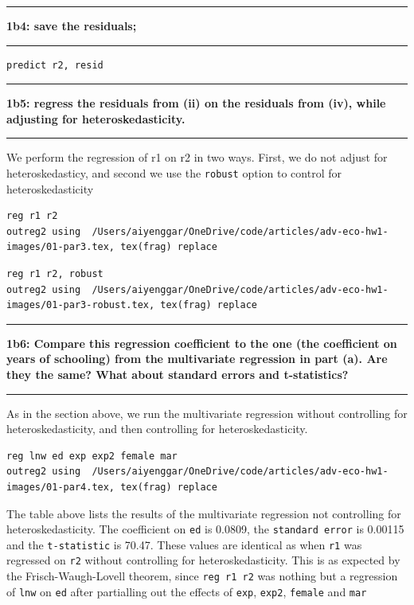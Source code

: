 \documentclass[12pt]{article}
\newcommand\question[2]{\vspace{1em}\hrule\vspace{1em}\textbf{#1: #2}\vspace{1em}\hrule\vspace{1em}}
\begin{document}
\question{1b4}{save the residuals; }
\begin{verbatim}predict r2, resid\end{verbatim}


\question{1b5}{regress the residuals from (ii) on the residuals from (iv), while adjusting for heteroskedasticity.}
We perform the regression of r1 on r2 in two ways. First, we do not adjust for heteroskedasticy, and second we use the \verb|robust| option to  control for heteroskedasticity
\begin{lstlisting}
reg r1 r2
outreg2 using  /Users/aiyenggar/OneDrive/code/articles/adv-eco-hw1-images/01-par3.tex, tex(frag) replace
\end{lstlisting}


\begin{lstlisting}
reg r1 r2, robust
outreg2 using  /Users/aiyenggar/OneDrive/code/articles/adv-eco-hw1-images/01-par3-robust.tex, tex(frag) replace
\end{lstlisting}


\question{1b6}{Compare this regression coefficient to the one (the coefficient on years of schooling) from the multivariate regression in part (a). Are they the same?  What about standard errors and t-statistics?  }
As in the section above, we run the multivariate regression without controlling for heteroskedasticity, and then controlling for heteroskedasticity.

\begin{lstlisting}
reg lnw ed exp exp2 female mar
outreg2 using  /Users/aiyenggar/OneDrive/code/articles/adv-eco-hw1-images/01-par4.tex, tex(frag) replace
\end{lstlisting}


The table above lists the results of the multivariate regression not controlling for heteroskedasticity. The coefficient on \verb|ed| is 0.0809, the \verb|standard error| is 0.00115 and the \verb|t-statistic| is 70.47. These values are identical as when \verb|r1| was regressed on \verb|r2| without controlling for heteroskedasticity. This is as expected by the Frisch-Waugh-Lovell theorem, since \verb|reg r1 r2| was nothing but a regression of \verb|lnw| on \verb|ed| after partialling out the effects of \verb|exp|, \verb|exp2|, \verb|female| and \verb|mar|
\end{document}
